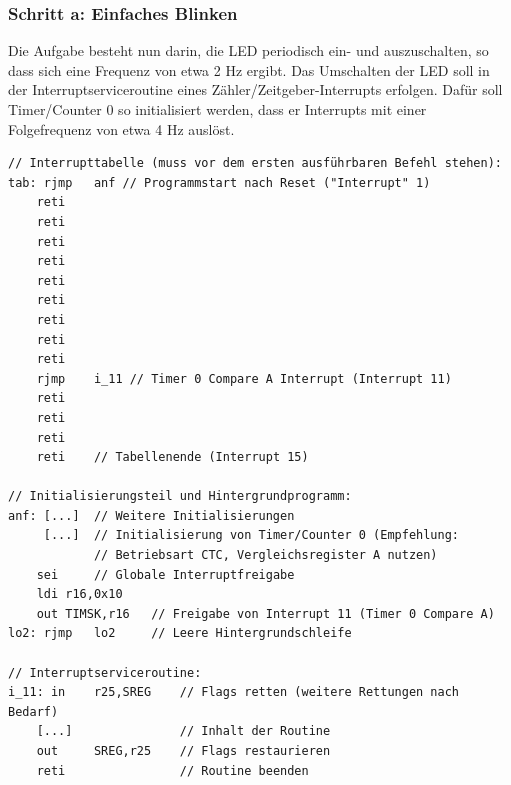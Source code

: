 \documentclass[a4paper,12pt,titlepage]{scrartcl}
\begin{document}
\subsubsection*{Schritt a: Einfaches Blinken}
Die Aufgabe besteht nun darin, die LED periodisch ein- und auszuschalten, so dass sich eine Frequenz von etwa 2 Hz ergibt. Das Umschalten der LED soll in der Interruptserviceroutine eines Zähler/Zeitgeber-Interrupts erfolgen. Dafür soll Timer/Counter 0 so initialisiert werden, dass er Interrupts mit einer Folgefrequenz von etwa 4 Hz auslöst.
\begin{lstlisting}[basicstyle=\tiny]
// Interrupttabelle (muss vor dem ersten ausführbaren Befehl stehen):
tab: rjmp   anf // Programmstart nach Reset ("Interrupt" 1)
    reti
    reti
    reti
    reti
    reti
    reti
    reti
    reti
    reti
    rjmp    i_11 // Timer 0 Compare A Interrupt (Interrupt 11)
    reti
    reti
    reti
    reti    // Tabellenende (Interrupt 15)

// Initialisierungsteil und Hintergrundprogramm:
anf: [...]  // Weitere Initialisierungen
     [...]  // Initialisierung von Timer/Counter 0 (Empfehlung:
            // Betriebsart CTC, Vergleichsregister A nutzen)
    sei     // Globale Interruptfreigabe
    ldi r16,0x10
    out TIMSK,r16   // Freigabe von Interrupt 11 (Timer 0 Compare A)
lo2: rjmp   lo2     // Leere Hintergrundschleife

// Interruptserviceroutine:
i_11: in    r25,SREG    // Flags retten (weitere Rettungen nach Bedarf)
    [...]               // Inhalt der Routine
    out     SREG,r25    // Flags restaurieren
    reti                // Routine beenden
\end{lstlisting}
\end{document}
